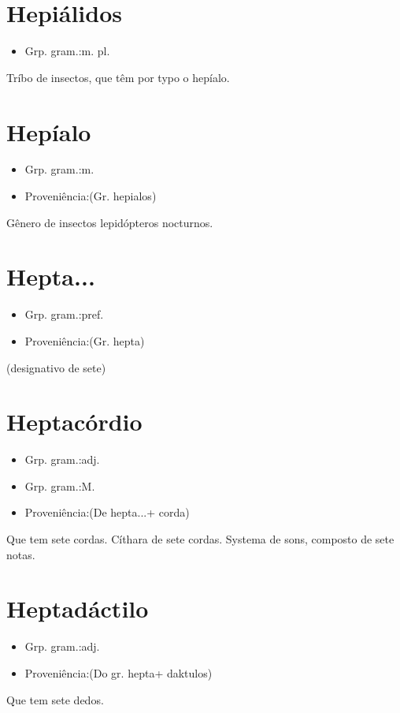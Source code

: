 \documentclass{article}
\begin{document}
\section{Hepiálidos}
\begin{itemize}
\item {Grp. gram.:m. pl.}
\end{itemize}
Tríbo de insectos, que têm por typo o hepíalo.
\section{Hepíalo}
\begin{itemize}
\item {Grp. gram.:m.}
\end{itemize}
\begin{itemize}
\item {Proveniência:(Gr. \textunderscore hepialos\textunderscore )}
\end{itemize}
Gênero de insectos lepidópteros nocturnos.
\section{Hepta...}
\begin{itemize}
\item {Grp. gram.:pref.}
\end{itemize}
\begin{itemize}
\item {Proveniência:(Gr. \textunderscore hepta\textunderscore )}
\end{itemize}
(designativo de \textunderscore sete\textunderscore )
\section{Heptacórdio}
\begin{itemize}
\item {Grp. gram.:adj.}
\end{itemize}
\begin{itemize}
\item {Grp. gram.:M.}
\end{itemize}
\begin{itemize}
\item {Proveniência:(De \textunderscore hepta...\textunderscore  + \textunderscore corda\textunderscore )}
\end{itemize}
Que tem sete cordas.
Cíthara de sete cordas.
Systema de sons, composto de sete notas.
\section{Heptadáctilo}
\begin{itemize}
\item {Grp. gram.:adj.}
\end{itemize}
\begin{itemize}
\item {Proveniência:(Do gr. \textunderscore hepta\textunderscore  + \textunderscore daktulos\textunderscore )}
\end{itemize}
Que tem sete dedos.
\end{document}
